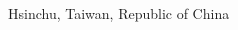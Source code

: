 \documentclass[class=NCU_thesis, crop=false, float=true]{standalone}
\begin{document}
\begin{spacing}{1.0}
\begin{titlepage}
\begin{center}
{        \deptEn 
        \vspace*{10mm} \vfill
        
        \degreedateEn \par
        \vspace*{10mm} \vfill
        
        Hsinchu, Taiwan, Republic of China \par
        \vspace*{10mm} \vfill
        \degreedateROC}
    \end{center}
\end{titlepage}
\end{spacing}
\restoregeometry
\rmfamily %
\cleardoublepage
\end{document}
